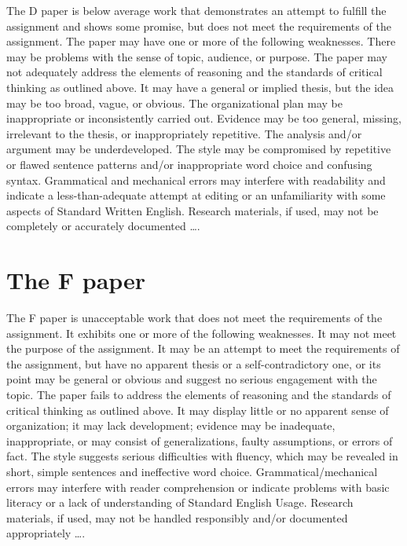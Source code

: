 The D paper is below average work that demonstrates an attempt to fulfill the assignment and shows some promise, but does not meet the requirements of the assignment. The paper may have one or more of the following weaknesses. There may be problems with the sense of topic, audience, or purpose. The paper may not adequately address the elements of reasoning and the standards of critical thinking as outlined above. It may have a general or implied thesis, but the idea may be too broad, vague, or obvious. The organizational plan may be inappropriate or inconsistently carried out. Evidence may be too general, missing, irrelevant to the thesis, or inappropriately repetitive. The analysis and/or argument may be underdeveloped. The style may be compromised by repetitive or flawed sentence patterns and/or inappropriate word choice and confusing syntax. Grammatical and mechanical errors may interfere with readability and indicate a less-than-adequate attempt at editing or an unfamiliarity with some aspects of Standard Written English. Research materials, if used, may not be completely or accurately documented \dots.

\section{The F paper}

The F paper is unacceptable work that does not meet the requirements of the assignment. It exhibits one or more of the following weaknesses. It may not meet the purpose of the assignment. It may be an attempt to meet the requirements of the assignment, but have no apparent thesis or a self-contradictory one, or its point may be general or obvious and suggest no serious engagement with the topic. The paper fails to address the elements of reasoning and the standards of critical thinking as outlined above. It may display little or no apparent sense of organization; it may lack development; evidence may be inadequate, inappropriate, or may consist of generalizations, faulty assumptions, or errors of fact. The style suggests serious difficulties with fluency, which may be revealed in short, simple sentences and ineffective word choice. Grammatical/mechanical errors may interfere with reader comprehension or indicate problems with basic literacy or a lack of understanding of Standard English Usage. Research materials, if used, may not be handled responsibly and/or documented appropriately \dots.

